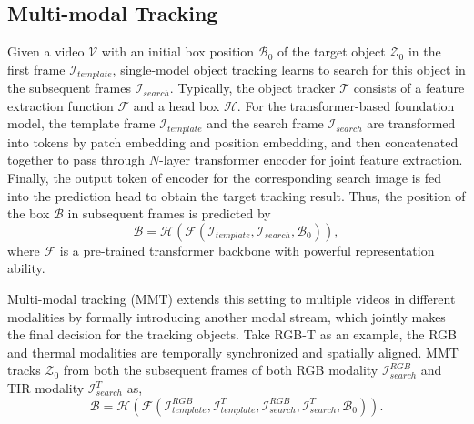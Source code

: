 \documentclass[letterpaper]{article} %
\begin{document}
\subsection{Multi-modal Tracking}
Given a video $\mathcal{V}$ with an initial box position $\mathcal{B}_0$ of the target object $\mathcal{Z}_0$ in the first frame $\mathcal{I}_{template}$, single-model object tracking learns to search for this object in the subsequent frames $\mathcal{I}_{search}$.
Typically, the object tracker $\mathcal{T}$ consists of a feature extraction function $\mathcal{F}$ and a head box $\mathcal{H}$. 
For the transformer-based foundation model, the template frame $\mathcal{I}_{template}$ and the search frame $\mathcal{I}_{search}$ are transformed into tokens by patch embedding and position embedding, and then concatenated together to pass through $N$-layer transformer encoder for joint feature extraction. 
Finally, the output token of encoder for the corresponding search image is fed into the prediction head to obtain the target tracking result. Thus, the position of the box $\mathcal{B}$ in subsequent frames is predicted by
\begin{equation}
    \mathcal{B}=\mathcal{H}(\mathcal{F} (\mathcal{I}_{template}, \mathcal{I}_{search}, \mathcal{B}_0)),
\end{equation}
where $\mathcal{F}$ is a pre-trained transformer backbone with powerful representation ability.

Multi-modal tracking (MMT) extends this setting to multiple videos in different modalities by formally introducing another modal stream, which jointly makes the final decision for the tracking objects.
Take RGB-T as an example, the RGB and thermal modalities are temporally synchronized and spatially aligned. MMT tracks $\mathcal{Z}_0$ from both the subsequent frames of both RGB modality $\mathcal{I}_{search}^{RGB}$ and TIR modality $\mathcal{I}_{search}^{T}$ as,
\begin{equation}
    \mathcal{B}=\mathcal{H}(\mathcal{F} (\mathcal{I}_{template}^{RGB}, \mathcal{I}_{template}^{T}, \mathcal{I}_{search}^{RGB}, \mathcal{I}_{search}^{T}, \mathcal{B}_0)).
\end{equation}
\end{document}
